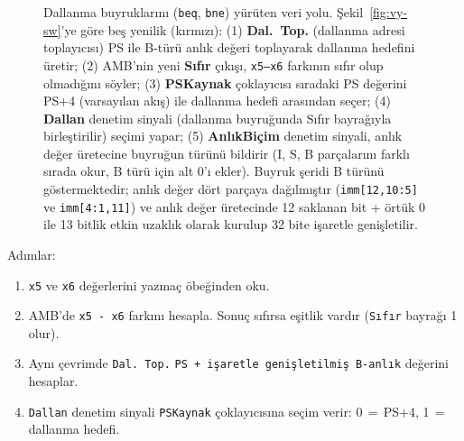 \begin{figure}[htbp]
\caption[Dallanma buyruklarını (\texttt{beq}, \texttt{bne}) yürüten veri yolu]{Dallanma buyruklarını (\texttt{beq}, \texttt{bne}) yürüten veri yolu. Şekil~\ref{fig:vy-sw}'ye göre beş yenilik (kırmızı): (1) \textbf{Dal.\ Top.} (dallanma adresi toplayıcısı) PS ile B-türü anlık değeri toplayarak dallanma hedefini üretir; (2) AMB'nin yeni \textbf{Sıfır} çıkışı, \texttt{x5--x6} farkının sıfır olup olmadığını söyler; (3) \textbf{PSKaynak} çoklayıcısı sıradaki PS değerini PS+4 (varsayılan akış) ile dallanma hedefi arasından seçer; (4) \textbf{Dallan} denetim sinyali (dallanma buyruğunda Sıfır bayrağıyla birleştirilir) seçimi yapar; (5) \textbf{AnlıkBiçim} denetim sinyali, anlık değer üretecine buyruğun türünü bildirir (I, S, B parçalarını farklı sırada okur, B türü için alt 0'ı ekler). Buyruk şeridi B türünü göstermektedir; anlık değer dört parçaya dağılmıştır (\texttt{imm[12,10:5]} ve \texttt{imm[4:1,11]}) ve anlık değer üretecinde 12 saklanan bit + örtük 0 ile 13 bitlik etkin uzaklık olarak kurulup 32 bite işaretle genişletilir.}
\label{fig:vy-beq}
\end{figure}

Adımlar:
\begin{enumerate}
    \item \texttt{x5} ve \texttt{x6} değerlerini yazmaç öbeğinden oku.
    \item AMB'de \texttt{x5 - x6} farkını hesapla. Sonuç sıfırsa eşitlik vardır (\texttt{Sıfır} bayrağı 1 olur).
    \item Aynı çevrimde \texttt{Dal.\,Top.} \texttt{PS + işaretle genişletilmiş B-anlık} değerini hesaplar.
    \item \texttt{Dallan} denetim sinyali \texttt{PSKaynak} çoklayıcısına seçim verir: 0\,$=$\,PS+4, 1\,$=$\,dallanma hedefi.
\end{enumerate}


